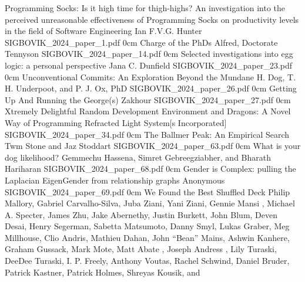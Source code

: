 \renewcommand{\thepage}{\roman{page}}
\setcounter{page}{3}

\newpage
\renewcommand{\thepage}{\arabic{page}}
\setcounter{page}{1}

\newcommand{\link}[2][]{\vspace{-1in} {\scriptsize #1 \url{#2}} \raisebox{-0.5\height}{\texttt{[image: participation]}}}
\newcommand{\badge}[1]{\texttt{[image: badges/badge\_\#1]}}
\newcommand{\badges}[1]{\vspace{-1in} \raisebox{-0.5\height}{#1}}
\addpaper
	{Programming Socks: Is it high time for thigh-highs? An investigation into the perceived unreasonable effectiveness of Programming Socks on productivity levels in the field of Software Engineering}
	{Ian F.V.G. Hunter}
	{}
	{SIGBOVIK_2024_paper_1.pdf}
	{0cm}
	{}
\addpaper
	{Charge of the PhDs}
	{Alfred, Doctorate Tennyson}
	{}
	{SIGBOVIK_2024_paper_14.pdf}
	{0cm}
	{}
\addpaper
	{Selected investigations into egg logic: a personal perspective}
	{Jana C. Dunfield}
	{}
	{SIGBOVIK_2024_paper_23.pdf}
	{0cm}
	{}
\addpaper
	{Unconventional Commits: An Exploration Beyond the Mundane}
	{H. Dog, T. H. Underpoot, and P. J. Ox, PhD}
	{}
	{SIGBOVIK_2024_paper_26.pdf}
	{0cm}
	{}
\addpaper
	{Getting Up And Running the \lambda{}}
	{George(s) Zakhour}
	{}
	{SIGBOVIK_2024_paper_27.pdf}
	{0cm}
	{}
\addpaper
	{Xtremely Delightful Random Development Environment and Dragons: A Novel Way of Programming}
	{Refracted Light System[s Incorporated]}
	{}
	{SIGBOVIK_2024_paper_34.pdf}
	{0cm}
	{}
\addpaper
	{The Ballmer Peak: An Empirical Search}
	{Twm Stone and Jaz Stoddart}
	{}
	{SIGBOVIK_2024_paper_63.pdf}
	{0cm}
	{}
\addpaper
	{What is your dog likelihood?}
	{Gemmechu Hassena, Simret Gebreegziabher, and Bharath Hariharan}
	{}
	{SIGBOVIK_2024_paper_68.pdf}
	{0cm}
	{}
\addpaper
	{Gender is Complex: pulling the Laplacian EigenGender from relationship graphs}
	{Anonymous}
	{}
	{SIGBOVIK_2024_paper_69.pdf}
	{0cm}
	{}
\addpaper
	{We Found the Best Shuffled Deck}
	{Philip Mallory, Gabriel Carvalho-Silva, Juba Ziani, Yani Ziani, Gennie Mansi , Michael A. Specter, James Zhu, Jake Abernethy, Justin Burkett, John Blum, Deven Desai, Henry Segerman, Sabetta Matsumoto, Danny Smyl, Lukas Graber, Meg Millhouse, Clio Andris, Mathieu Dahan, John ``Bean'' Mains, Ashwin Kanhere, Graham Gussack, Mark Mote, Matt Abate  , Joseph Andress , Lily Turaski, DeeDee Turaski, I. P. Freely, Anthony Voutas, Rachel Schwind, Daniel Bruder, Patrick Kastner, Patrick Holmes, Shreyas Kousik, and }
